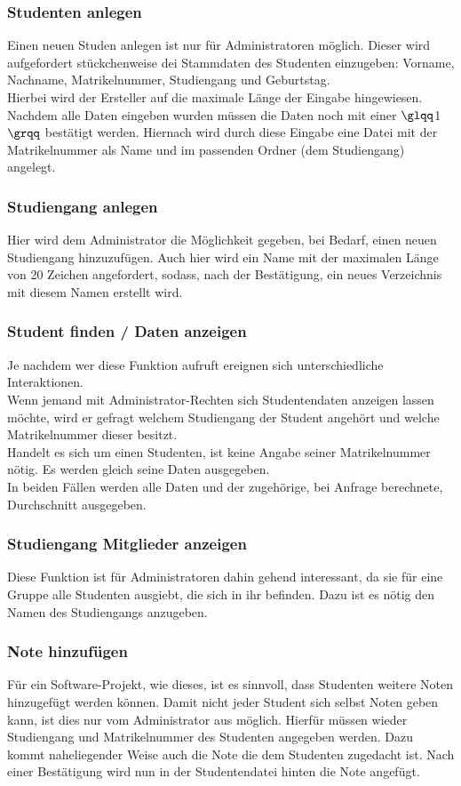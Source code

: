 \documentclass{scrartcl}
\begin{document}
		\subsubsection{Studenten anlegen}
			Einen neuen Studen anlegen ist nur für Administratoren möglich. Dieser wird aufgefordert stückchenweise dei Stammdaten des Studenten einzugeben: Vorname, Nachname, Matrikelnummer, Studiengang und Geburtstag.\\
			Hierbei wird der Ersteller auf die maximale Länge der Eingabe hingewiesen. Nachdem alle Daten eingeben wurden müssen die Daten noch mit einer $\glqq$1$\grqq$ bestätigt werden. Hiernach wird durch diese Eingabe  eine Datei mit der Matrikelnummer als Name und im passenden Ordner (dem Studiengang) angelegt.
		\subsubsection{Studiengang anlegen}
			Hier wird dem Administrator die Möglichkeit gegeben, bei Bedarf, einen neuen Studiengang hinzuzufügen. Auch hier wird ein Name mit der maximalen Länge von 20 Zeichen angefordert, sodass, nach der Bestätigung, ein neues Verzeichnis mit diesem Namen erstellt wird.
		\subsubsection{Student finden / Daten anzeigen}
			Je nachdem wer diese Funktion aufruft ereignen sich unterschiedliche Interaktionen. \\
			Wenn jemand mit Administrator-Rechten sich Studentendaten anzeigen lassen möchte, wird er gefragt welchem Studiengang der Student angehört und welche Matrikelnummer dieser besitzt.\\
			Handelt es sich um einen Studenten, ist keine Angabe seiner Matrikelnummer nötig. Es werden gleich seine Daten ausgegeben.\\
			In beiden Fällen werden alle Daten und der zugehörige, bei Anfrage berechnete, Durchschnitt ausgegeben.
		\subsubsection{Studiengang Mitglieder anzeigen}
			Diese Funktion ist für Administratoren dahin gehend interessant, da sie für eine Gruppe alle Studenten ausgiebt, die sich in ihr befinden. Dazu ist es nötig den Namen des Studiengangs anzugeben.
		\subsubsection{Note hinzufügen}
			Für ein Software-Projekt, wie dieses, ist es sinnvoll, dass Studenten weitere Noten hinzugefügt werden können. Damit nicht jeder Student sich selbst Noten geben kann, ist dies nur vom Administrator aus möglich. Hierfür müssen wieder Studiengang und Matrikelnummer des Studenten angegeben werden. Dazu kommt naheliegender Weise auch die Note die dem Studenten zugedacht ist. Nach einer Bestätigung wird nun in der Studentendatei hinten die Note angefügt.
\end{document}
